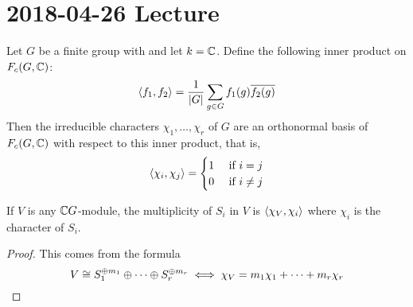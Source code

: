 \section{2018-04-26 Lecture}

\begin{thm}
  Let $G$ be a finite group with and let $k=\mathbb{C}$.
  Define the following inner product on $F_c(G,\mathbb{C})$:
  \[{\left\langle f_1,f_2 \right\rangle} = \frac{1}{\left\lvert G \right\rvert} \sum_{g \in G} f_1(g) \overline{f_2(g)}\]
  Then the irreducible characters $\chi_1,\ldots,\chi_r$ of $G$ are an orthonormal basis of $F_c(G,\mathbb{C})$ with respect to this inner product, that is,
  \begin{equation*}
    {\left\langle \chi_i,\chi_j \right\rangle}=
    \begin{cases}
      1 & \text{ if } i=j \\
      0 & \text{ if } i \neq j
    \end{cases}
  \end{equation*}
\end{thm}

\begin{cor}
  If $V$ is any $\mathbb{C} G$-module, the multiplicity of $S_i$ in $V$ is ${\left\langle \chi_V,\chi_i \right\rangle}$ where $\chi_i$ is the character of $S_i$.
\end{cor}

\begin{proof}
  This comes from the formula
  \[V \cong S_1^{\oplus m_1} \oplus \cdots \oplus S_r^{\oplus m_r} \iff \chi_V = m_1\chi_1 + \cdots + m_r\chi_r \qedhere\]
\end{proof}

